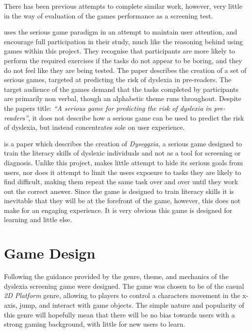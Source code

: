 \documentclass[journal]{IEEEtran}
\begin{document}
There has been previous attempts to complete similar work, however, very little in the way of evaluation of the games performance as a screening test.

\cite{SeriousForPredicting} uses the serious game paradigm in an attempt to maintain user attention, and encourage full participation in their study, much like the reasoning behind using games within this project. They recognise that participants are more likely to perform the required exercises if the tasks do not appear to be boring, and they do not feel like they are being tested. The paper describes the creation of a set of serious games, targeted at predicting the risk of dyslexia in pre-readers. The target audience of the games demand that the tasks completed by participants are primarily non verbal, though an alphabetic theme runs throughout.  Despite the papers title: \emph{``A serious game for predicting the risk of dyslexia in pre-readers''}, it does not describe how a serious game can be used to predict the risk of dyslexia, but instead concentrates sole on user experience.

\cite{Dyseggxia} is a paper which describes the creation of \textit{Dyseggxia}, a serious game designed to train the literacy skills of dyslexic individuals and not as a tool for screening or diagnosis.  Unlike this project, \cite{Dyseggxia} makes little attempt to hide its serious goals from users, nor does it attempt to limit the users exposure to tasks they are likely to find difficult, making them repeat the same task over and over until they work out the correct answer. Since the game is designed to train literacy skills it is inevitable that they will be at the forefront of the game, however, this does not make for an engaging experience. It is very obvious this game is designed for learning and little else. 

\section{Game Design}
\label{sec:gamedesign}

Following the guidance provided by \cite{artOfGameDesign} the genre, theme, and mechanics of the dyslexia screening game were designed. The game was chosen to be of the casual \emph{2D Platform} genre, allowing to players to control a characters movement in the x-axis, jump, and interact with game objects. The simple nature and popularity of this genre will hopefully mean that there will be no bias towards users with a strong gaming background, with little for new users to learn. 
\end{document}
